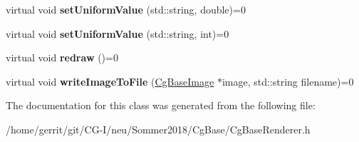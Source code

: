 \begin{DoxyCompactItemize}
\mbox{\label{class_cg_base_renderer_a1ef61b1bec430925875341386b13c2df}} 
virtual void {\bfseries set\+Uniform\+Value} (std\+::string, double)=0
\item 
\mbox{\label{class_cg_base_renderer_a4fc8ef92609e49fc239899d295215f18}} 
virtual void {\bfseries set\+Uniform\+Value} (std\+::string, int)=0
\item 
\mbox{\label{class_cg_base_renderer_a3959461cfd58a182ab6a0e8d3c201b9c}} 
virtual void {\bfseries redraw} ()=0
\item 
\mbox{\label{class_cg_base_renderer_a6695b069387ed1819f4261c160566744}} 
virtual void {\bfseries write\+Image\+To\+File} (\hyperlink{class_cg_base_image}{Cg\+Base\+Image} $\ast$image, std\+::string filename)=0
\end{DoxyCompactItemize}


The documentation for this class was generated from the following file\+:\begin{DoxyCompactItemize}
\item 
/home/gerrit/git/\+C\+G-\/\+I/neu/\+Sommer2018/\+Cg\+Base/Cg\+Base\+Renderer.\+h\end{DoxyCompactItemize}
